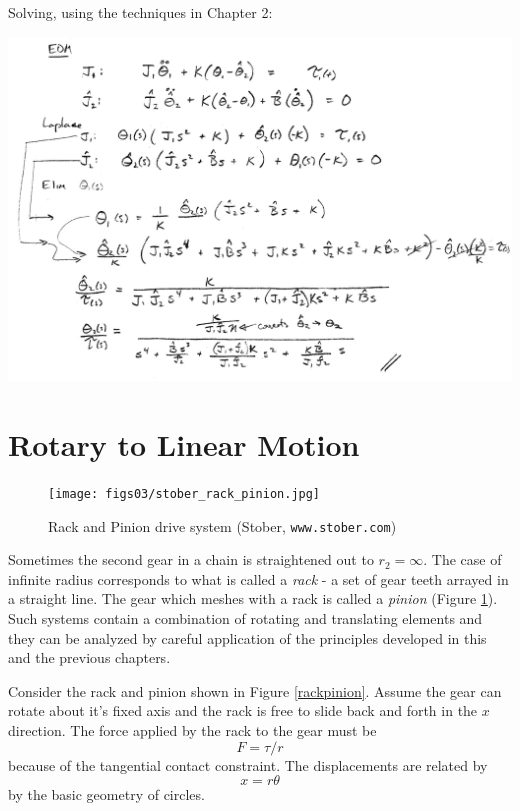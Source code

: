 \begin{ExampleCont}

Solving, using the techniques in Chapter 2:

\includegraphics[width=6.0in]{figs03/00753.png}  

\end{ExampleCont}


\section{Rotary to Linear Motion} 

\begin{figure}\centering
\texttt{[image: figs03/stober\_rack\_pinion.jpg]}
\caption{Rack and Pinion drive system (Stober, {\tt www.stober.com})}\label{stoberrackpinion}
\end{figure}

Sometimes the second gear in a chain is straightened out to $r_2 = \infty$.  The case of infinite radius corresponds to what is called a {\it rack} - a set of gear teeth arrayed in a straight line.  The gear which meshes with a rack is called a {\it pinion} (Figure \ref{stoberrackpinion}).  Such systems contain a combination of rotating and translating elements and they can be analyzed by careful application of the principles developed in this and the previous chapters.  

Consider the rack and pinion shown in Figure \ref{rackpinion}.  Assume the gear can rotate about it's fixed axis and the rack is free to slide back and forth in the $x$ direction.  The force applied by the rack to the gear must be 
\[
F = \tau/r
\]
because of the tangential contact constraint.   The displacements are related by
\[
x = r\theta
\]
by the basic geometry of circles. 

